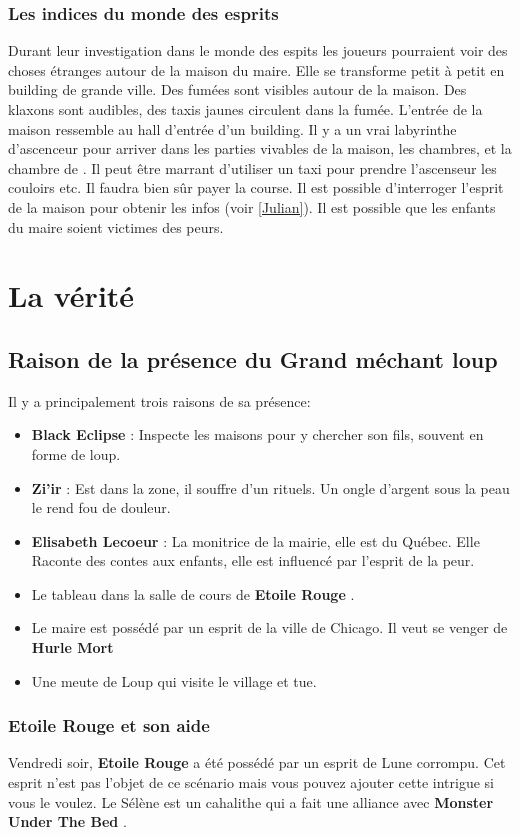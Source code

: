 \documentclass[oneside,12pt]{book}
\newcommand{\Lynn}{\textbf{Etoile Rouge} }
\newcommand{\Peter}{\textbf{Hurle Mort} }
\newcommand{\Monster}{\textbf{Monster Under The Bed} }
\newcommand{\BlackEclipse}{\textbf{Black Eclipse} }
\newcommand{\Elisabeth}{\textbf{Elisabeth Lecoeur} }
\newcommand{\Thomas}{\textbf{Zi'ir} }
\begin{document}
\begin{flushleft}
\subsection{Les indices du monde des esprits}
Durant leur investigation dans le monde des espits les joueurs pourraient voir des choses étranges autour de la maison du maire. 
Elle se transforme petit à petit en building de grande ville. Des fumées sont visibles autour de la maison. Des klaxons sont audibles, des taxis jaunes circulent dans la fumée. 
L'entrée de la maison ressemble au hall d'entrée d'un building. Il y a un vrai labyrinthe d'ascenceur pour arriver dans les parties vivables de la maison, les chambres, et la chambre de \Julian. Il peut être marrant d'utiliser un taxi pour prendre l'ascenseur les couloirs etc. Il faudra bien sûr payer la course. 
Il est possible d'interroger l'esprit de la maison pour obtenir les infos (voir \ref{Julian}). Il est possible que les enfants du maire soient victimes des peurs. 




\chapter{La vérité}


\section{Raison de la présence du Grand méchant loup}
Il y a principalement trois raisons de sa présence: 
\begin{itemize}
\item \BlackEclipse : Inspecte les maisons pour y chercher son fils, souvent en forme de loup. 
\item \Thomas : Est dans la zone, il souffre d'un rituels. Un ongle d'argent sous la peau le rend fou de douleur.
\item \Elisabeth : La monitrice de la mairie, elle est du Québec. Elle Raconte des contes aux enfants, elle est influencé par l'esprit de la peur.
\item Le tableau dans la salle de cours de \Lynn. 
\item Le maire est possédé par un esprit de la ville de Chicago. Il veut se venger de \Peter
\item Une meute de Loup qui visite le village et tue.
\end{itemize}

\subsection{\Lynn et son aide}
Vendredi soir, \Lynn a été possédé par un esprit de Lune corrompu. Cet esprit n'est pas l'objet de ce scénario mais vous pouvez ajouter cette intrigue si vous le voulez. Le Sélène est un cahalithe qui a fait une alliance avec \Monster .



\end{flushleft}
\end{document}
